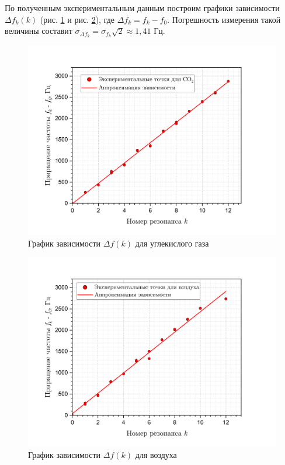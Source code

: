 \documentclass[a4paper, 12pt]{article}
\begin{document}
            \noindent По полученным экспериментальным данным построим графики зависимости $\Delta f_k(k)$ (рис. \ref{f(k)_CO2} и рис. \ref {f(k)_oxy}), где $\Delta f_k = f_k - f_0$. Погрешность измерения такой величины составит $\sigma_{\Delta f_k} = \sigma_{f_k}\sqrt{2} \approx 1,41 $ Гц.

            \begin{figure}[H]
                \centering
                \includegraphics[scale = 0.5]{images/f(k)_CO2.png}
                \caption{График зависимости $\Delta f(k)$ для углекислого газа}
                \label{f(k)_CO2}
            \end{figure}

            \begin{figure}[H]
                \centering
                \includegraphics[scale = 0.5]{images/f(k)_oxy.png}
                \caption{График зависимости $\Delta f(k)$ для воздуха}
                \label{f(k)_oxy}
            \end{figure}
\end{document}

